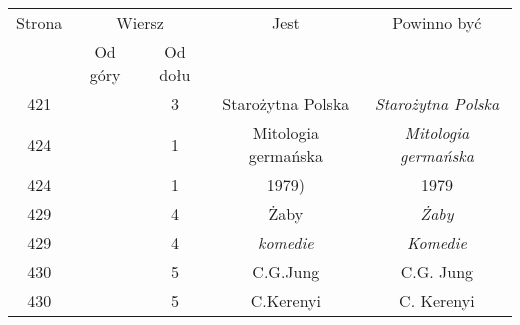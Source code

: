 \documentclass[a4paper,11pt]{article}
\begin{document}
\begin{center}
  \begin{tabular}{|c|c|c|c|c|}
    \hline
    Strona & \multicolumn{2}{c|}{Wiersz} & Jest
                              & Powinno być \\ \cline{2-3}
    & Od góry & Od dołu & & \\
    \hline
    421 & &  3 & Starożytna Polska & \textit{Starożytna Polska} \\
    424 & &  1 & Mitologia germańska & \textit{Mitologia germańska} \\
    424 & &  1 & 1979) & 1979 \\
    429 & &  4 & Żaby & \textit{Żaby} \\
    429 & &  4 & \textit{komedie} & \textit{Komedie} \\
    430 & &  5 & C.G.Jung & C.G. Jung \\
    430 & &  5 & C.Kerenyi & C. Kerenyi \\
    \hline
  \end{tabular}






\end{center}
\end{document}
